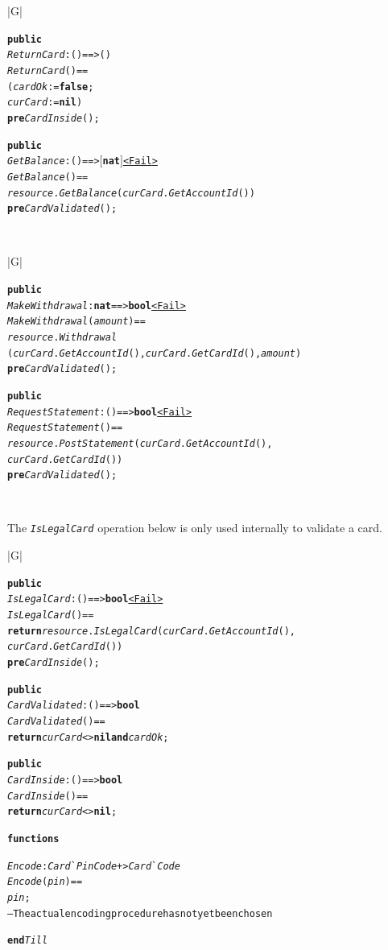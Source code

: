 \documentclass[\pformat,12pt,twoside]{article}
\newenvironment{VDMgray}%
{\begin{tabular}{|G|}\hline\small\begin{alltt}}%
{\end{alltt}\normalsize\\
 \hline\end{tabular}}
\begin{document}
\begin{VDMgray}
 \textbf{public}
 \textit{ReturnCard} : () ==\texttt{>} ()
 \textit{ReturnCard}() ==
   (\textit{cardOk} := \textbf{false};
    \textit{curCard}:= \textbf{nil})
  \textbf{pre} \textit{CardInside}();

 \textbf{public}
 \textit{GetBalance} : () ==\texttt{>} \ensuremath{[}\textbf{nat}\ensuremath{]}{\underline{{\textbar}\texttt{<}Fail\texttt{>}}}
 \textit{GetBalance}() ==
   \textit{resource}.\textit{GetBalance}(\textit{curCard}.\textit{GetAccountId}())
 \textbf{pre} \textit{CardValidated}();
\end{VDMgray}

\begin{VDMgray}
 \textbf{public}
 \textit{MakeWithdrawal} : \textbf{nat} ==\texttt{>} \textbf{bool} {\underline{{\textbar} \texttt{<}Fail\texttt{>}}}
 \textit{MakeWithdrawal}(\textit{amount}) ==
   \textit{resource}.\textit{Withdrawal}
     (\textit{curCard}.\textit{GetAccountId}(),\textit{curCard}.\textit{GetCardId}(),\textit{amount})
 \textbf{pre} \textit{CardValidated}();

 \textbf{public}
 \textit{RequestStatement} : () ==\texttt{>} \textbf{bool} {\underline{{\textbar} \texttt{<}Fail\texttt{>}}}
 \textit{RequestStatement}() ==
   \textit{resource}.\textit{PostStatement}(\textit{curCard}.\textit{GetAccountId}(),
                                      \textit{curCard}.\textit{GetCardId}())
 \textbf{pre} \textit{CardValidated}();
\end{VDMgray}


The \texttt{\emph{IsLegalCard}} operation below is only used internally to validate 
a card.

\begin{VDMgray}
 \textbf{public}
 \textit{IsLegalCard} : () ==\texttt{>} \textbf{bool} {\underline{{\textbar} \texttt{<}Fail\texttt{>}}}
 \textit{IsLegalCard}() ==
   \textbf{return} \textit{resource}.\textit{IsLegalCard}(\textit{curCard}.\textit{GetAccountId}(),
                               \textit{curCard}.\textit{GetCardId}())
 \textbf{pre} \textit{CardInside}();

 \textbf{public}
 \textit{CardValidated}: () ==\texttt{>} \textbf{bool}
 \textit{CardValidated}() ==
   \textbf{return} \textit{curCard} \texttt{<}\texttt{>} \textbf{nil} \textbf{and} \textit{cardOk};

 \textbf{public}
 \textit{CardInside}: () ==\texttt{>} \textbf{bool}
 \textit{CardInside}() ==
   \textbf{return} \textit{curCard} \texttt{<}\texttt{>} \textbf{nil};

\textbf{functions}


 \textit{Encode}: \textit{Card}\`{}\textit{PinCode} +\texttt{>} \textit{Card}\`{}\textit{Code}
 \textit{Encode}(\textit{pin}) ==
   \textit{pin};
   -- The actual encoding procedure has not yet been chosen

\textbf{end} \textit{Till}
\end{VDMgray}
\end{document}
